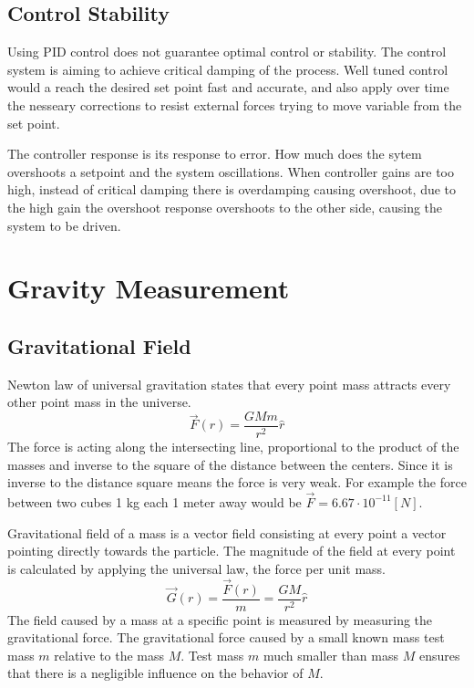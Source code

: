 \documentclass[\main/master.tex]{subfiles}
\begin{document}
\subsection{Control Stability}
Using PID control does not guarantee optimal control or stability. The control system is aiming to achieve critical damping of the process. Well tuned control would a reach the desired set point fast and accurate, and also apply over time the nesseary corrections to resist external forces trying to move variable from the set point.
\par
The controller response is its response to error. How much does the sytem overshoots a setpoint and the system oscillations. When controller gains are too high, instead of critical damping there is overdamping causing overshoot, due to the high gain the overshoot response overshoots to the other side, causing the system to be driven.





\section{Gravity Measurement}

\subsection{Gravitational Field}
Newton law of universal gravitation states that every point mass attracts every other point mass in the universe.
\begin{equation}
\overrightarrow{F}(r) = \frac{GMm}{r^2}\hat{r}    \label{eqn:gravitation_force}
\end{equation} 
The force is acting along the intersecting line, proportional to the product of the masses and inverse to the square of the distance between the centers. Since it is inverse to the distance square means the force is very weak. For example the force between two cubes 1 kg each 1 meter away would be $\overrightarrow{F} = 6.67\cdot10^{-11} [N]$.
\par
Gravitational field of a mass is a vector field consisting at every point a vector pointing directly towards the particle. The magnitude of the field at every point is calculated by applying the universal law, the force per unit mass. 
\begin{equation}
\overrightarrow{G}(r) = \frac{\overrightarrow{F}(r)}{m} = \frac{GM}{r^2}\hat{r}    \label{eqn:gravitation_field}
\end{equation}
The field caused by a mass at a specific point is measured by measuring the gravitational force. The gravitational force caused by a small known mass test mass $m$ relative to the mass $M$. Test mass $m$ much smaller than mass $M$ ensures that there is a negligible influence on the behavior of $M$.  
\end{document}
